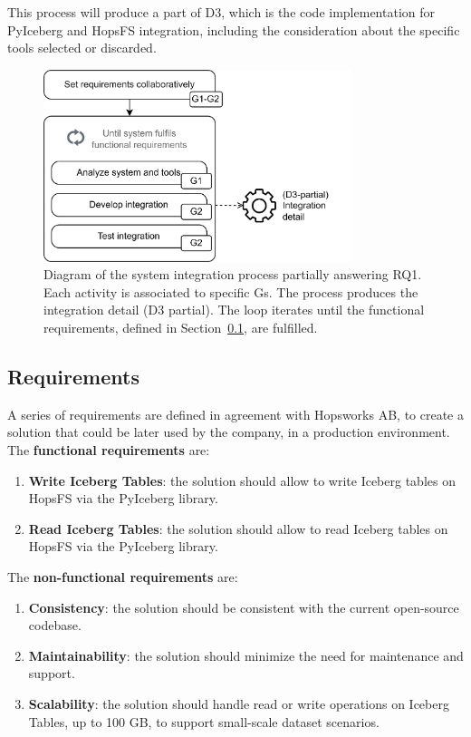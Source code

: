 This process will produce a part of \gls{D}3, which is the code implementation for PyIceberg and \gls{HopsFS} integration, including the consideration about the specific tools selected or discarded.

\begin{figure}[!t]
    \begin{center}
      \includegraphics[width=0.8\textwidth]{figures/3-method/method_code.png}
    \caption[System integration process]{Diagram of the system integration process partially answering \gls{RQ}1. Each activity is associated to specific \glspl{G}. The process produces the integration detail (\gls{D}3 partial). The loop iterates until the functional requirements, defined in Section~\ref{subsec:integration_reqs}, are fulfilled.}
    \label{fig:method_code_schema}
    \end{center}
\end{figure}


\subsection{Requirements}
\label{subsec:integration_reqs}
A series of requirements are defined in agreement with Hopsworks AB, to create a solution that could be later used by the company, in a production environment. The \textbf{functional requirements} are:
\begin{enumerate}
    \item \textbf{Write Iceberg Tables}: the solution should allow to write Iceberg tables on \gls{HopsFS} via the PyIceberg library.
    \item \textbf{Read Iceberg Tables}: the solution should allow to read Iceberg tables on \gls{HopsFS} via the PyIceberg library.
\end{enumerate}
The \textbf{non-functional requirements} are:
\begin{enumerate}
    \item \textbf{Consistency}: the solution should be consistent with the current open-source codebase.
    \item \textbf{Maintainability}: the solution should minimize the need for maintenance and support.
    \item \textbf{Scalability}: the solution should handle read or write operations on Iceberg Tables, up to 100 GB, to support small-scale dataset scenarios.
\end{enumerate}



